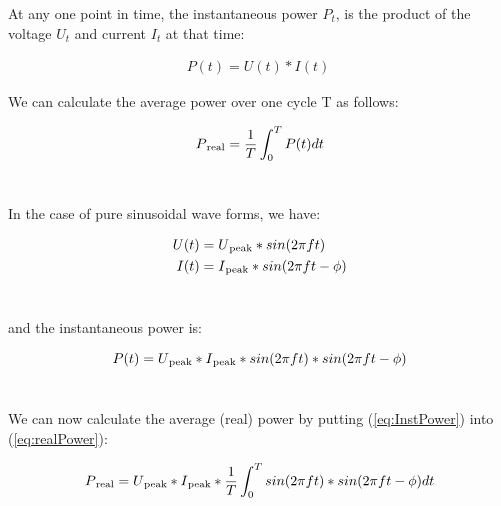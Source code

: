 \documentclass[a4paper]{article}
\def\SB#1{\textsubscript{{#1}}}
\begin{document}
\vspace{20pt}


At any one point in time, the instantaneous power $P_t$, is the product of
the voltage $U_t$ and current $I_t$ at that time:

\begin{align*}
   P(t) = U(t) * I(t)\
\end{align*}

We can calculate the average power over one cycle T as follows:

\begin{equation} \label{eq:realPower}
  P\SB{real} = \frac{1}{T} \int_0^{T}{P(t)} dt\\
\end{equation}\

In the case of pure sinusoidal wave forms, we have:

\begin{align*}
  U(t) &= U\SB{peak} * sin(2\pi ft)\\
  I(t) &= I\SB{peak} * sin(2\pi ft - \phi)\\
\end{align*}\

and the instantaneous power is:

\begin{equation} \label{eq:InstPower}
  P(t) = U\SB{peak} * I\SB{peak} * sin(2\pi ft) * sin(2\pi ft - \phi)\\
\end{equation}\

We can now calculate the average (real) power by putting (\ref{eq:InstPower}) into
(\ref{eq:realPower}):

\begin{equation} \label{realPower}
  P\SB{real} = U\SB{peak} * I\SB{peak} * \frac{1}{T} \int_0^{T}{sin(2\pi ft) * sin(2\pi ft - \phi)} dt\\
\end{equation}\
\end{document}
